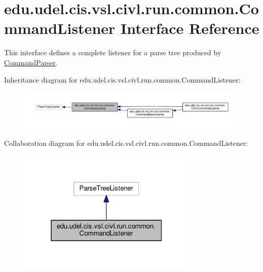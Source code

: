 \hypertarget{interfaceedu_1_1udel_1_1cis_1_1vsl_1_1civl_1_1run_1_1common_1_1CommandListener}{}\section{edu.\+udel.\+cis.\+vsl.\+civl.\+run.\+common.\+Command\+Listener Interface Reference}
\label{interfaceedu_1_1udel_1_1cis_1_1vsl_1_1civl_1_1run_1_1common_1_1CommandListener}


This interface defines a complete listener for a parse tree produced by \hyperlink{classedu_1_1udel_1_1cis_1_1vsl_1_1civl_1_1run_1_1common_1_1CommandParser}{Command\+Parser}.  




Inheritance diagram for edu.\+udel.\+cis.\+vsl.\+civl.\+run.\+common.\+Command\+Listener\+:
\nopagebreak
\begin{figure}[H]
\begin{center}
\leavevmode
\includegraphics[width=350pt]{interfaceedu_1_1udel_1_1cis_1_1vsl_1_1civl_1_1run_1_1common_1_1CommandListener__inherit__graph}
\end{center}
\end{figure}


Collaboration diagram for edu.\+udel.\+cis.\+vsl.\+civl.\+run.\+common.\+Command\+Listener\+:
\nopagebreak
\begin{figure}[H]
\begin{center}
\leavevmode
\includegraphics[width=243pt]{interfaceedu_1_1udel_1_1cis_1_1vsl_1_1civl_1_1run_1_1common_1_1CommandListener__coll__graph}
\end{center}
\end{figure}
